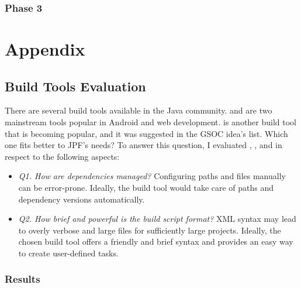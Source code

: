 \documentclass{article}
\begin{document}
\subsubsection*{Phase 3}

\clearpage

\appendix
\section{Appendix}
\subsection{Build Tools Evaluation}
\label{sec:eval}

There are several build tools available in the Java community.
\maven{} and \gradle{} are two mainstream tools popular in Android and web
development.
\sbt{}\cite{page:sbt} is another build tool that is becoming popular, and it
was suggested in the GSOC idea's list\cite{page:jpf-gsoc18}.
Which one fits better to JPF's needs?
To answer this question, I evaluated \maven{}, \gradle{}, and \sbt{} in respect
to the following aspects:

\begin{itemize}
\item \emph{Q1. How are dependencies managed?} Configuring paths and \jar{}
files manually can be error-prone. Ideally, the build tool would take care of
paths and dependency versions automatically.
\item \emph{Q2. How brief and powerful is the build script format?} XML syntax
may lead to overly verbose and large files for sufficiently large projects.
Ideally, the chosen build tool offers a friendly and brief syntax and provides
an easy way to create user-defined tasks.

\end{itemize}

\subsubsection*{Results}
\label{sec:results}
\end{document}
